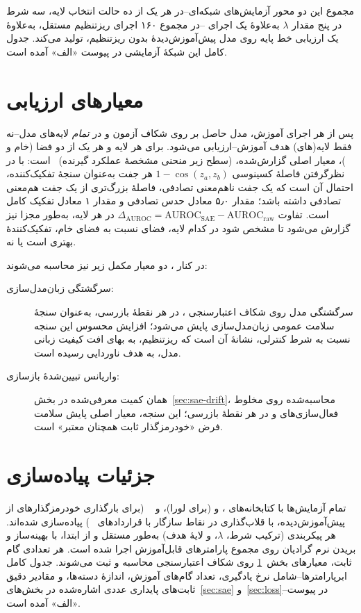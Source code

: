 مجموع این دو محور آزمایش‌های شبکه‌ای--در هر یک از ده حالت انتخاب لایه، سه شرط در پنج مقدار
$\lambda$
به‌علاوهٔ یک اجرای
--در مجموع ۱۶۰ اجرای ریزتنظیم مستقل، به‌علاوهٔ یک ارزیابی خط پایه روی مدل پیش‌آموزش‌دیدهٔ بدون ریزتنظیم، تولید می‌کند. جدول کامل این شبکهٔ آزمایشی در پیوست «الف» آمده است.

\section{معیارهای ارزیابی}
\label{sec:metrics}
پس از هر اجرای آموزش، مدل حاصل بر روی شکاف آزمون
و در \emph{تمام} لایه‌های مدل--نه فقط لایه(های) هدف آموزش--ارزیابی می‌شود. برای هر لایه و هر یک از دو فضا (خام و
)، معیار اصلی گزارش‌شده،
(سطح زیر منحنی مشخصهٔ عملکرد گیرنده)~\cite{fawcett2006roc}
است: با در نظرگرفتن فاصلهٔ کسینوسی
$1-\cos(z_a,z_b)$
هر جفت به‌عنوان سنجهٔ تفکیک‌کننده،
احتمال آن است که یک جفت ناهم‌معنی تصادفی، فاصلهٔ بزرگ‌تری از یک جفت هم‌معنی تصادفی داشته باشد؛ مقدار
۵٫۰
معادل حدس تصادفی و مقدار
۱
معادل تفکیک کامل است. تفاوت
$\Delta_{\mathrm{AUROC}} = \mathrm{AUROC}_{\mathrm{SAE}} - \mathrm{AUROC}_{\mathrm{raw}}$
در هر لایه، به‌طور مجزا نیز گزارش می‌شود تا مشخص شود در کدام لایه، فضای
نسبت به فضای خام، تفکیک‌کنندهٔ بهتری است یا نه.

در کنار
، دو معیار مکمل زیر نیز محاسبه می‌شوند:

\begin{description}
\item[سرگشتگی زبان‌مدل‌سازی:]
سرگشتگی مدل روی شکاف اعتبارسنجی
، در هر نقطهٔ بازرسی، به‌عنوان سنجهٔ سلامت عمومی زبان‌مدل‌سازی پایش می‌شود؛ افزایش محسوس این سنجه نسبت به شرط کنترلی، نشانهٔ آن است که ریزتنظیم، به بهای افت کیفیت زبانی مدل، به هدف ناوردایی رسیده است.
\item[واریانس تبیین‌شدهٔ بازسازی:]
همان کمیت معرفی‌شده در بخش~\ref{sec:sae-drift}، محاسبه‌شده روی مخلوط فعال‌سازی‌های
و
در هر نقطهٔ بازرسی؛ این سنجه، معیار اصلی پایش سلامت فرض «خودرمزگذار ثابت همچنان معتبر» است.
\end{description}

\section{جزئیات پیاده‌سازی}
\label{sec:impl}
تمام آزمایش‌ها با کتابخانه‌های
، 
و
(برای لورا)، و
~\cite{bloom2024saelens}
(برای بارگذاری خودرمزگذارهای از پیش‌آموزش‌دیده، با قلاب‌گذاری در نقاط سازگار با قراردادهای
~\cite{nanda2022transformerlens}) پیاده‌سازی شده‌اند. هر پیکربندی (ترکیب شرط،
$\lambda$، و لایهٔ هدف) به‌طور مستقل و از ابتدا، با بهینه‌ساز
و بریدن نرم گرادیان
روی مجموع پارامترهای قابل‌آموزش اجرا شده است. هر تعدادی گام ثابت، معیارهای بخش~\ref{sec:metrics} روی شکاف اعتبارسنجی محاسبه و ثبت می‌شوند. جدول کامل ابرپارامترها--شامل نرخ یادگیری، تعداد گام‌های آموزش، اندازهٔ دسته‌ها، و مقادیر دقیق ثابت‌های پایداری عددی اشاره‌شده در بخش‌های~\ref{sec:sae} و~\ref{sec:loss}--در پیوست «الف» آمده است.
